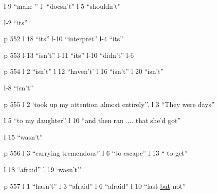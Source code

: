 l-9 ``make '' \quad l- ``doesn't'' \quad l-5 ``shouldn't''

l-2 ``its''

p 552 l 18 ``its'' \quad l-10 ``interpret'' \quad l-4 ``its''

p 553 l-13 ``isn't'' \quad l-11 ``its'' \quad l-10 ``didn't'' \quad l-6

p 554 l 2 ``isn't'' \quad l 12 ``haven't' \quad l 16 ``isn't'' \quad l 20 ``isn't''

l-8 ``isn't''

p 555 l 2 `took up my attention almost entirely''. \quad l 3 ``They were days''

l 5 ``to my daughter'' \quad l 10 ``and then ran .... that she'd got''

l 15 ``wasn't''

p 556 l 3 ``carrying tremendous'' \quad l 6 ``to escape'' \quad l 13 `` to get''

l 18 ``afraid'' \quad l 19 `wasn't''

p 557 l 1 ``hasn't'' \quad l 3 ``afraid'' \quad l 6 ``afraid'' \quad l 10 ``last \uline{but} not''
